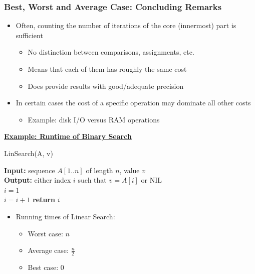 \subsubsection{Best, Worst and Average Case: Concluding Remarks}
\begin{itemize}
    \item Often, counting the number of iterations of the core (innermost) part is sufficient
    \begin{itemize}
        \item No distinction between comparisons, assignments, etc.
        \item Means that each of them has roughly the same cost
        \item Does provide results with good/adequate precision
    \end{itemize}
    \item In certain cases the cost of a specific operation may dominate all other costs
    \begin{itemize}
        \item Example: disk I/O versus RAM operations
    \end{itemize}
\end{itemize}

\noindent
\textbf{\underline{Example: Runtime of Binary Search}} \\
\bigskip

\begin{center}
\begin{minipage}{0.6\textwidth}
\begin{algorithm}[H]
\caption{LinSearch(A, v)}
\textbf{Input:} sequence $A[1..n]$ of length $n$, value $v$ \\
\textbf{Output:} either index $i$ such that $v = A[i]$ or $\text{NIL}$ \\
$i = 1$ \\
 {
    $i = i + 1$\;}
 {
     \textbf{return} $i$\;
     }
\end{algorithm}
\end{minipage}
\end{center}
\begin{itemize}
    \item Running times of Linear Search:
    \begin{itemize}
    \item Worst case: $n$
    \item Average case: $\frac{n}{2}$
    \item Best case: 0
\end{itemize}
\end{itemize}


